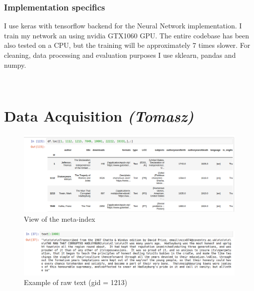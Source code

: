 \documentclass[journal,12pt,onecolumn]{IEEEtran}
\begin{document}
\subsubsection{Implementation specifics}

I use keras with tensorflow backend for the Neural Network implementation. I train my network an using nvidia GTX1060 GPU. The entire codebase has been also tested on a CPU, but the training will be approximately 7 times slower. For cleaning, data processing and evaluation purposes I use sklearn, pandas and numpy.






\

\section{Data Acquisition \textit{(Tomasz)}}\label{sec:Dataset}

\begin{figure}[t]
    \centering
    \includegraphics[width=\textwidth]{meta_view.png}
    \caption{View of the meta-index}
    \label{fig:meta_view}
\end{figure}

\begin{figure}[b]
    \centering
    \includegraphics[width=\linewidth]{raw_text.png}
    \caption{Example of raw text (gid = 1213)}
    \label{fig:raw_text}
\end{figure}
\end{document}
